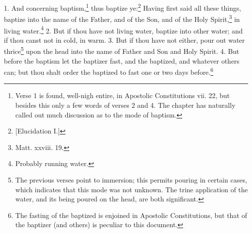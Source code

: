 1. And concerning baptism,\footnote{\par  Verse 1 is found, well-nigh entire, in Apostolic Constitutions vii. 22, but besides this only a few words of verses 2 and 4. The chapter has naturally called out much discussion as to the mode of baptism.} thus baptize ye:\footnote{\par{}  [Elucidation I.]} Having first said all these things, baptize into the name of the Father, and of the Son, and of the Holy Spirit,\footnote{\par  Matt. xxviii. 19.} in living water.\footnote{\par  Probably running water.} 2. But if thou have not living water, baptize into other water; and if thou canst not in cold, in warm. 3. But if thou have not either, pour out water thrice\footnote{\par  The previous verses point to immersion; this permits pouring in certain cases, which indicates that this mode was not unknown. The trine application of the water, and its being poured on the head, are both significant.} upon the head into the name of Father and Son and Holy Spirit. 4. But before the baptism let the baptizer fast, and the baptized, and whatever others can; but thou shalt order the baptized to fast one or two days before.\footnote{\par  The fasting of the baptized is enjoined in Apostolic Constitutions, but that of the baptizer (and others) is peculiar to this document.}


